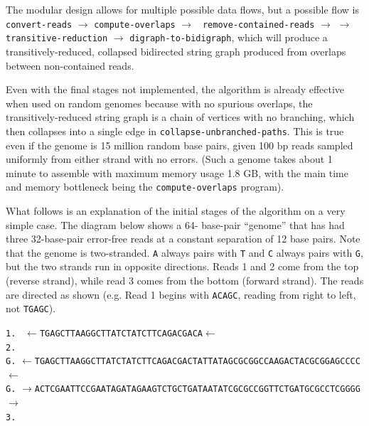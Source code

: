 \documentclass[letterpaper,12pt]{article}
\begin{document}
The modular design allows for multiple possible data flows, but a possible flow
is {\tt convert-reads} $\to$ {\tt compute-overlaps} $\to$ {\tt
remove-contained-reads} $\to$  $\to$ {\tt
transitive-reduction} $\to$ {\tt digraph-to-bidigraph}, which will produce a
transitively-reduced, collapsed bidirected string graph produced from overlaps
between non-contained reads.

Even with the final stages not implemented, the algorithm is already effective
when used on random genomes because with no spurious overlaps, the
transitively-reduced string graph is a chain of vertices with no branching,
which then collapses into a single edge in {\tt collapse-unbranched-paths}.
This is true even if the genome is 15 million random base pairs, given 100 bp
reads sampled uniformly from either strand with no errors.  (Such a genome takes
about 1 minute to assemble with maximum memory usage 1.8 GB, with the main time
and memory bottleneck being the {\tt compute-overlaps} program).

What follows is an explanation of the initial stages of the algorithm on a very
simple case.  The diagram below shows a 64- base-pair ``genome'' that has had
three 32-base-pair error-free reads at a constant separation of 12 base pairs.
Note that the genome is two-stranded.  {\tt A} always pairs with {\tt T} and
{\tt C} always pairs with {\tt G}, but the two strands run in opposite
directions.  Reads 1 and 2 come from the top (reverse strand), while read 3
comes from the bottom (forward strand).  The reads are directed as shown (e.g.
Read 1 begins with {\tt ACAGC}, reading from right to left, not {\tt TGAGC}).

\vspace{0.5cm}
\nopagebreak

\noindent
{\tt 1.}
{\tt \color{red} $\leftarrow$TGAGCTTAAGGCTTATCTATCTTCAGACGACA$\leftarrow$ }\\
{\tt 2.}
\\
{\tt G.}
{\tt $\leftarrow$TGAGCTTAAGGCTTATCTATCTTCAGACGACTATTATAGCGCGGCCAAGACTACGCGGAGCCCC$\leftarrow$} \\
{\tt G.}
{\tt $\rightarrow$ACTCGAATTCCGAATAGATAGAAGTCTGCTGATAATATCGCGCCGGTTCTGATGCGCCTCGGGG$\rightarrow$} \\
{\tt 3.}
\end{document}
